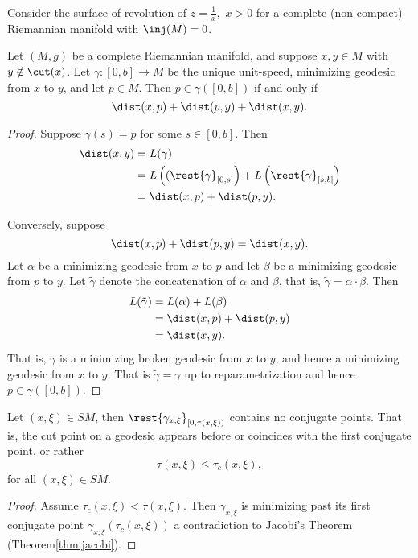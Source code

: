 Consider the surface of revolution of $z=\frac{1}{x},$ $x>0$ for a complete (non-compact) Riemannian manifold with $\inj(M)=0$.

\begin{prop}
    Let $(M,g)$ be a complete Riemannian manifold, and suppose $x,y\in M$ with $y\notin\cut(x)$.  Let $\gamma:[0,b]\to M$ be the unique unit-speed, minimizing geodesic from $x$ to $y$, and let $p\in M$.  Then $p\in\gamma([0,b])$ if and only if
    $$\dist(x,p)+\dist(p,y)+\dist(x,y).$$
\end{prop}

\begin{proof}
Suppose $\gamma(s)=p$ for some $s\in[0,b]$.  Then
\begin{align*}
	\dist(x,y)&=L(\gamma)\\
	&=L\left((\rest{\gamma}_{[0,s]}\right)+L\left(\rest{\gamma}_{[s,b]}\right)\\
	&=\dist(x,p)+\dist(p,y).
\end{align*}

Conversely, suppose
$$\dist(x,p)+\dist(p,y)=\dist(x,y).$$
Let $\alpha$ be a minimizing geodesic from $x$ to $p$ and let $\beta$ be a minimizing geodesic from $p$ to $y$.  Let $\tilde{\gamma}$ denote the concatenation of $\alpha$ and $\beta$, that is, $\tilde{\gamma}=\alpha\cdot\beta$.  Then
\begin{align*}
	L(\tilde{\gamma})&=L(\alpha)+L(\beta)\\
	&=\dist(x,p)+\dist(p,y)\\
	&=\dist(x,y).
\end{align*}
That is, $\gamma$ is a minimizing broken geodesic from $x$ to $y$, and hence a minimizing geodesic from $x$ to $y$.  That is $\tilde{\gamma}=\gamma$ up to reparametrization and hence $p\in\gamma([0,b])$.
\end{proof}



\begin{lem}
    Let $(x,\xi)\in SM$, then $\rest{\gamma_{x,\xi}}_{[0,\tau(x,\xi))}$ contains no conjugate points.  That is, the cut point on a geodesic appears before or coincides with the first conjugate point, or rather
    $$\tau(x,\xi)\leq\tau_c(x,\xi),$$
    for all $(x,\xi)\in SM$.
\end{lem}

\begin{proof}
Assume $\tau_c(x,\xi)<\tau(x,\xi)$.  Then $\gamma_{x,\xi}$ is minimizing past its first conjugate point $\gamma_{x,\xi}(\tau_c(x,\xi))$ a contradiction to Jacobi's Theorem (Theorem\autoref{thm:jacobi}).
\end{proof}

